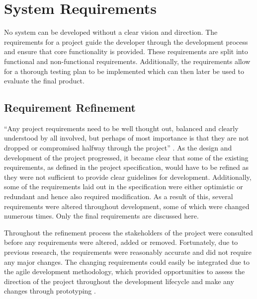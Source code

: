 \chapter{System Requirements}
\label{Chapter:SystemRequirements}
No system can be developed without a clear vision and direction. The requirements for a project guide the developer through the development process and ensure that core functionality is provided. These requirements are split into functional and non-functional requirements. Additionally, the requirements allow for a thorough testing plan to be implemented which can then later be used to evaluate the final product. 

\section{Requirement Refinement}
``Any project requirements need to be well thought out, balanced and clearly understood by all involved, but perhaps of most importance is that they are not dropped or compromised halfway through the project'' \cite{ReQTest:Requirements}. As the design and development of the project progressed, it became clear that some of the existing requirements, as defined in the project specification, would have to be refined as they were not sufficient to provide clear guidelines for development. Additionally, some of the requirements laid out in the specification were either optimistic or redundant and hence also required modification. As a result of this, several requirements were altered throughout development, some of which were changed numerous times. Only the final requirements are discussed here.

Throughout the refinement process the stakeholders of the project were consulted before any requirements were altered, added or removed. Fortunately, due to previous research, the requirements were reasonably accurate and did not require any major changes. The changing requirements could easily be integrated due to the agile development methodology, which provided opportunities to assess the direction of the project throughout the development lifecycle and make any changes through prototyping \cite{Agile:Home}.

